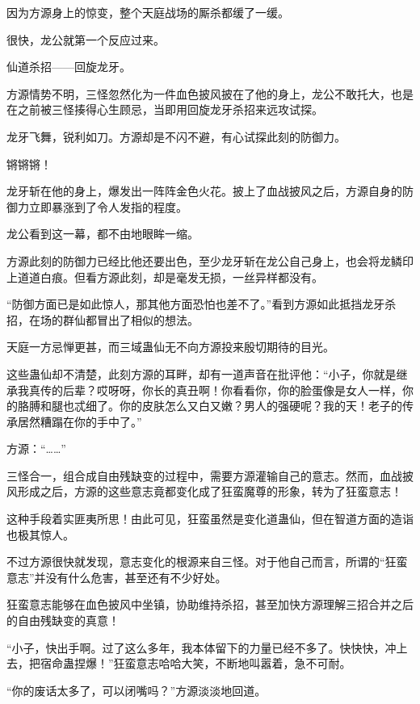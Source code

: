 
\begin{this_body}



因为方源身上的惊变，整个天庭战场的厮杀都缓了一缓。

很快，龙公就第一个反应过来。

仙道杀招——回旋龙牙。

方源情势不明，三怪忽然化为一件血色披风披在了他的身上，龙公不敢托大，也是在之前被三怪揍得心生顾忌，当即用回旋龙牙杀招来远攻试探。

龙牙飞舞，锐利如刀。方源却是不闪不避，有心试探此刻的防御力。

锵锵锵！

龙牙斩在他的身上，爆发出一阵阵金色火花。披上了血战披风之后，方源自身的防御力立即暴涨到了令人发指的程度。

龙公看到这一幕，都不由地眼眸一缩。

方源此刻的防御力已经比他还要出色，至少龙牙斩在龙公自己身上，也会将龙鳞印上道道白痕。但看方源此刻，却是毫发无损，一丝异样都没有。

“防御方面已是如此惊人，那其他方面恐怕也差不了。”看到方源如此抵挡龙牙杀招，在场的群仙都冒出了相似的想法。

天庭一方忌惮更甚，而三域蛊仙无不向方源投来殷切期待的目光。

这些蛊仙却不清楚，此刻方源的耳畔，却有一道声音在批评他：“小子，你就是继承我真传的后辈？哎呀呀，你长的真丑啊！你看看你，你的脸蛋像是女人一样，你的胳膊和腿也忒细了。你的皮肤怎么又白又嫩？男人的强硬呢？我的天！老子的传承居然糟蹋在你的手中了。”

方源：“……”

三怪合一，组合成自由残缺变的过程中，需要方源灌输自己的意志。然而，血战披风形成之后，方源的这些意志竟都变化成了狂蛮魔尊的形象，转为了狂蛮意志！

这种手段着实匪夷所思！由此可见，狂蛮虽然是变化道蛊仙，但在智道方面的造诣也极其惊人。

不过方源很快就发现，意志变化的根源来自三怪。对于他自己而言，所谓的“狂蛮意志”并没有什么危害，甚至还有不少好处。

狂蛮意志能够在血色披风中坐镇，协助维持杀招，甚至加快方源理解三招合并之后的自由残缺变的真意！

“小子，快出手啊。过了这么多年，我本体留下的力量已经不多了。快快快，冲上去，把宿命蛊捏爆！”狂蛮意志哈哈大笑，不断地叫嚣着，急不可耐。

“你的废话太多了，可以闭嘴吗？”方源淡淡地回道。


\end{this_body}
